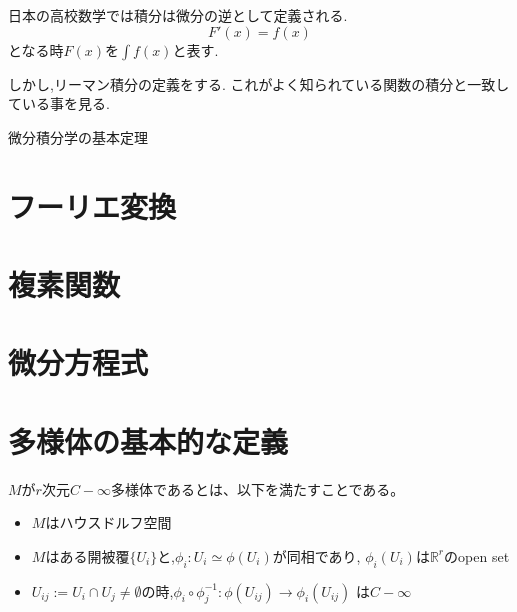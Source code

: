 \documentclass{ujarticle}
\begin{document}
日本の高校数学では積分は微分の逆として定義される.
\begin{equation*}
 F'(x) = f(x)
\end{equation*}
となる時$F(x)$を$\int f(x)$と表す.

しかし,リーマン積分の定義をする.
これがよく知られている関数の積分と一致している事を見る.


微分積分学の基本定理
\section{フーリエ変換}

\section{複素関数}

\section{微分方程式}

\section{多様体の基本的な定義}
\begin{dfn}
$M$が$r$次元$C-{\infty}$多様体であるとは、以下を満たすことである。
\begin{itemize}
   \item $M$はハウスドルフ空間
   \item $M$はある開被覆$\{U_i\}$と,$\phi_i:U_i \simeq \phi(U_i)$が同相であり,
         $\phi_i(U_i)$は$\mathbb{R}^r$のopen set
   \item $U_{ij} := U_i \cap U_j \neq \emptyset$の時,$\phi_i \circ \phi_j^{-1}: \phi(U_{ij}) \to \phi_i(U_{ij})$
         は$C-\infty$
\end{itemize}
\end{dfn}
\end{document}
